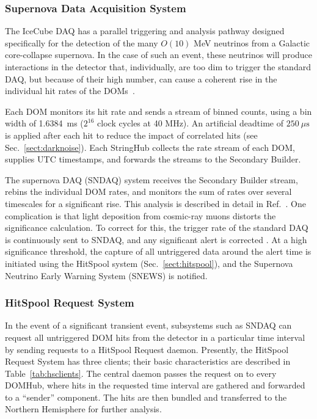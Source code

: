 \subsubsection{\label{sect:SNDAQ}Supernova Data Acquisition System}

The IceCube DAQ has a parallel triggering and analysis pathway designed
specifically for the detection of the many $O(10)$ MeV neutrinos from a
Galactic core-collapse supernova.  In the case of such an event, these
neutrinos will produce interactions in
the detector that, individually, are too dim to trigger the standard DAQ,
but because of their high number, can cause a coherent rise in the
individual hit rates of the DOMs~\cite{IC3:supernova}.

Each DOM monitors its hit rate and sends a stream of binned counts, using a
bin width of 1.6384~ms ($2^{16}$ clock cycles at 40 MHz).  An artificial
deadtime of $250\ {\mu}\mathrm{s}$ is applied after each hit to reduce the
impact of correlated hits (see Sec.~\ref{sect:darknoise}).  Each
StringHub collects the rate stream of each DOM, supplies UTC timestamps,
and forwards the streams to the Secondary Builder.

The supernova DAQ (SNDAQ) system receives the Secondary Builder stream,
rebins the individual DOM rates, and monitors the sum of rates over several
timescales for a significant rise.  This analysis is described in
detail in Ref.~\cite{IC3:supernova}.  One complication is that light
deposition from cosmic-ray muons distorts the significance
calculation.  To correct for this, the trigger rate of the standard DAQ is
continuously sent to SNDAQ, and any significant alert is corrected
\cite{IC3:icrc15_sndaq}.  At a high significance threshold, the capture of
all untriggered data around the alert time is initiated using the HitSpool
system (Sec.~\ref{sect:hitspool}), and the Supernova Neutrino Early Warning
System (SNEWS) \cite{SNEWS} is notified.

\subsubsection{\label{sect:hitspool}HitSpool Request System}

In the event of a significant transient event, subsystems such as SNDAQ can
request all untriggered DOM hits from the detector in 
a particular time interval by sending requests to a HitSpool Request daemon. Presently,
the HitSpool Request System has three clients; 
their basic characteristics are described in
Table~\ref{tab:hsclients}.  The central daemon passes the request on to 
every DOMHub, where hits in the requested time
interval are gathered and forwarded to a ``sender'' component.  The hits
are then bundled and transferred to the Northern Hemisphere for further analysis.

